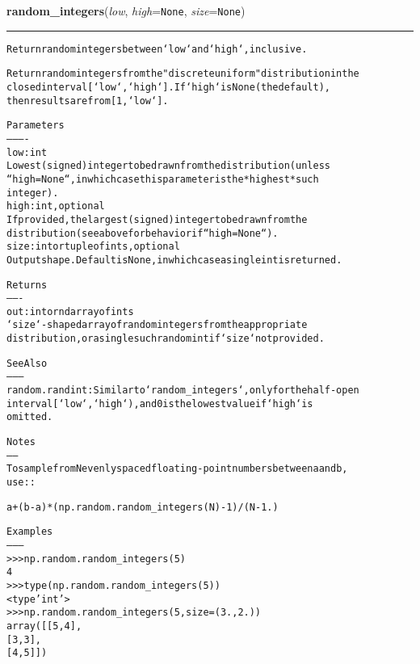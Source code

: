     \label{trunk:qstkutil:bollinger:random_integers}

    \vspace{0.5ex}

\hspace{.8\funcindent}\begin{boxedminipage}{\funcwidth}

    \raggedright \textbf{random\_integers}(\textit{low}, \textit{high}={\tt None}, \textit{size}={\tt None})

    \vspace{-1.5ex}

    \rule{\textwidth}{0.5\fboxrule}
\setlength{\parskip}{2ex}
\begin{alltt}
Return random integers between `low` and `high`, inclusive.

Return random integers from the "discrete uniform" distribution in the
closed interval [`low`, `high`].  If `high` is None (the default),
then results are from [1, `low`].

Parameters
----------
low : int
    Lowest (signed) integer to be drawn from the distribution (unless
    ``high=None``, in which case this parameter is the *highest* such
    integer).
high : int, optional
    If provided, the largest (signed) integer to be drawn from the
    distribution (see above for behavior if ``high=None``).
size : int or tuple of ints, optional
    Output shape. Default is None, in which case a single int is returned.

Returns
-------
out : int or ndarray of ints
    `size`-shaped array of random integers from the appropriate
    distribution, or a single such random int if `size` not provided.

See Also
--------
random.randint : Similar to `random\_integers`, only for the half-open
    interval [`low`, `high`), and 0 is the lowest value if `high` is
    omitted.

Notes
-----
To sample from N evenly spaced floating-point numbers between a and b,
use::

  a + (b - a) * (np.random.random\_integers(N) - 1) / (N - 1.)

Examples
--------
{\textgreater}{\textgreater}{\textgreater} np.random.random\_integers(5)
4
{\textgreater}{\textgreater}{\textgreater} type(np.random.random\_integers(5))
{\textless}type 'int'{\textgreater}
{\textgreater}{\textgreater}{\textgreater} np.random.random\_integers(5, size=(3.,2.))
array([[5, 4],
       [3, 3],
       [4, 5]])


\end{alltt}
\end{boxedminipage}
